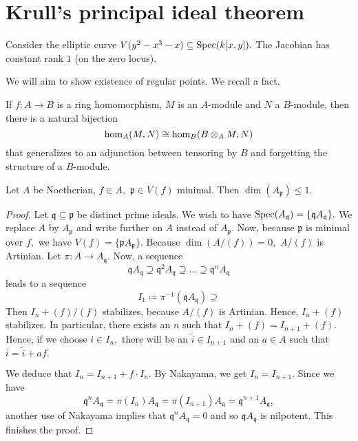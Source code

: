 \section{Krull's principal ideal theorem}

\begin{example}
  Consider the elliptic curve
  \(V(y^2-x^3-x) \subseteq \text{Spec}(k[x, y]).\)
  The Jacobian has constant rank \(1\) (on the zero locus).
\end{example}

We will aim to show existence of regular points. We recall a fact.
\begin{note}
  If \(f \colon A \to B\) is a ring homomorphism, \(M\) is an \(A\)-module and \(N\) a \(B\)-module, then there is a natural bijection
  \[\hom_A(M, N) \cong \hom_B(B \otimes_A M, N)\]
  that generalizes to an adjunction between tensoring by \(B\) and forgetting the structure of a \(B\)-module.
\end{note}

\begin{theorem}
  \label{krull's principal ideal theorem}
  Let \(A\) be Noetherian, \(f \in A,\) \(\mathfrak p \in V(f)\) minimal. Then \(\dim(A_{\mathfrak p}) \leq 1.\)
\end{theorem}
\begin{proof}
  Let \(\mathfrak q \subseteq \mathfrak p\) be distinct prime ideals. We wish to have
  \(\text{Spec}(A_{\mathfrak q}) = \{ \mathfrak q A_{\mathfrak q}\}.\)
  We replace \(A\) by \(A_{\mathfrak p}\) and write further on \(A\) instead of \(A_{\mathfrak p}.\)
  Now, because \(\mathfrak p\) is minimal over \(f,\) we have
  \(V(f) = \{\mathfrak p A_{\mathfrak p}\}.\)
  Because \(\dim(A/{(f)}) = 0,\) \(A/{(f)}\) is Artinian.
  Let \(\pi \colon A \to A_{\mathfrak q}.\) Now, a sequence
  \[\mathfrak q A_{\mathfrak q} \supseteq \mathfrak q^2 A_{\mathfrak q} \supseteq \dotso \supseteq \mathfrak q^n A_{\mathfrak q}\]
  leads to a sequence
  \[I_1 \coloneqq \pi^{-1}(\mathfrak q A_{\mathfrak q}) \supseteq\]
  Then \(I_n+(f)/{(f)}\) stabilizes, because \(A/{(f)}\) is Artinian. Hence, \(I_n + (f)\) stabilizes. In particular, there exists an \(n\) such that \(I_n + (f) = I_{n+1} + (f).\)
  Hence, if we choose \(i \in I_n,\) there will be an \(\tilde{i} \in I_{n+1}\) and an \(a \in A\) such that
  \(i = \tilde{i} + af.\)

  We deduce that \(I_n = I_{n+1} + f \cdot I_n\). By Nakayama,
  we get \(I_n = I_{n+1}.\)
  Since we have
  \[\mathfrak q^n A_{\mathfrak q} = \pi(I_n)A_{\mathfrak q} = \pi(I_{n+1}) A_{\mathfrak q} = \mathfrak q^{n+1} A_{\mathfrak q},\]
  another use of Nakayama implies that \(\mathfrak q^n A_{\mathfrak q} = 0\) and so \(\mathfrak q A_{\mathfrak q}\) is nilpotent.
  This finishes the proof.
\end{proof}

